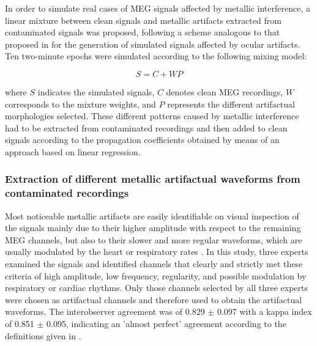 In order to simulate real cases of MEG signals affected by metallic interference, a linear mixture between clean signals and metallic artifacts extracted from contaminated signals was proposed, following a scheme analogous to that proposed in \citep{Romero2008} for the generation of simulated signals affected by ocular artifacts. Ten two-minute epochs were simulated according to the following mixing model:

\begin{equation} \label{eq:1-1} 
S=C+WP
\end{equation}

where $S$ indicates the simulated signals, $C$ denotes clean MEG recordings, $W$ corresponds to the mixture weights, and $P$ represents the different artifactual morphologies selected. These different patterns caused by metallic interference had to be extracted from contaminated recordings and then added to clean signals according to the propagation coefficients obtained by means of an approach based on linear regression.

\subsubsection*{Extraction of different metallic artifactual waveforms from contaminated recordings}

Most noticeable metallic artifacts are easily identifiable on visual inspection of the signals mainly due to their higher amplitude with respect to the remaining MEG channels, but also to their slower and more regular waveforms, which are usually modulated by the heart or respiratory rates \citep{Hillebrand2013}. In this study, three experts examined the signals and identified channels that clearly and strictly met these criteria of high amplitude, low frequency, regularity, and possible modulation by respiratory or cardiac rhythms. Only those channels selected by all three experts were chosen as artifactual channels and therefore used to obtain the artifactual waveforms. The interobserver agreement was of 0.829 $\pm$ 0.097 with a kappa index of 0.851 $\pm$ 0.095, indicating an 'almost perfect' agreement according to the definitions given in \citep{Viera2005}.

